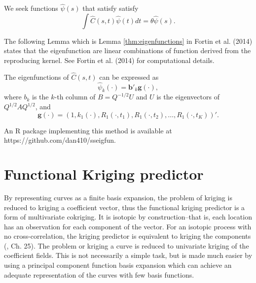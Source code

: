 We seek functions $\hat{\psi}(s)$ that satisfy satisfy 
\begin{equation}
	\label{eq:eigenfuns} \int \hat{C}(s,t)\hat{\psi}(t)dt=\theta\hat{\psi}(s). 
\end{equation}

The following Lemma which is Lemma \ref{thm:eigenfunctions} in Fortin et al. (2014) states that the eigenfunction are linear combinations of function derived from the reproducing kernel. See Fortin et al. (2014) for computational details.
\begin{lemma}
	\label{thm:eigenfunctions} The eigenfunctions of $\hat{C}(s,t)$ can be expressed as 
	\begin{equation*}
		\hat{\psi}_k(\cdot) = \mathbf{b}'_k\mathbf{g}(\cdot), 
	\end{equation*}
	where $b_k$ is the $k$-th column of $B=Q^{-1/2}U$ and $U$ is the eigenvectors of $Q^{1/2}AQ^{1/2}$, and
	\[ \mathbf{g(\cdot)}=(1, k_1(\cdot),R_{1}(\cdot, t_1),R_{1}(\cdot, t_2),\dots, R_{1}(\cdot, t_K))'. \]
\end{lemma}
An R package implementing this method is available at https://github.com/dan410/sseigfun.


\section{Functional Kriging predictor} 

\label{sec:functional_kriging_predictor}

By representing curves as a finite basis expansion, the problem of kriging is reduced to kriging a coefficient vector, thus the functional kriging predictor is a form of multivariate cokriging. It is isotopic by construction--that is, each location has an observation for each component of the vector. For an isotopic process with no cross-correlation, the kriging predictor is equivalent to kriging the components (\cite{wackernagel2003multivariate}, Ch. 25). The problem or kriging a curve is reduced to univariate kriging of the coefficient fields. This is not necessarily a simple task, but is made much easier by using a principal component function basis expansion which can achieve an adequate representation of the curves with few basis functions.

